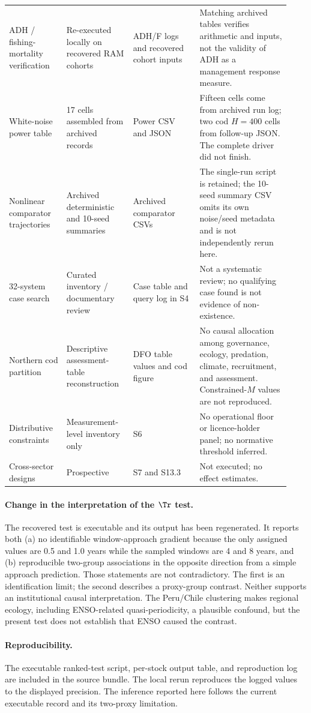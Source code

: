 \begin{longtable}{@{}p{0.19\linewidth}p{0.22\linewidth}p{0.22\linewidth}p{0.30\linewidth}@{}}
ADH / fishing-mortality verification & Re-executed locally on recovered RAM cohorts & ADH/F logs and recovered cohort inputs & Matching archived tables verifies arithmetic and inputs, not the validity of ADH as a management response measure. \\
White-noise power table & 17 cells assembled from archived records & Power CSV and JSON & Fifteen cells come from archived run log; two cod \(H=400\) cells from follow-up JSON. The complete driver did not finish. \\
Nonlinear comparator trajectories & Archived deterministic and 10-seed summaries & Archived comparator CSVs & The single-run script is retained; the 10-seed summary CSV omits its own noise/seed metadata and is not independently rerun here. \\
32-system case search & Curated inventory / documentary review & Case table and query log in S4 & Not a systematic review; no qualifying case found is not evidence of non-existence. \\
Northern cod partition & Descriptive assessment-table reconstruction & DFO table values and cod figure & No causal allocation among governance, ecology, predation, climate, recruitment, and assessment. Constrained-\(M\) values are not reproduced. \\
Distributive constraints & Measurement-level inventory only & S6 & No operational floor or licence-holder panel; no normative threshold inferred. \\
Cross-sector designs & Prospective & S7 and S13.3 & Not executed; no effect estimates. \\

\end{longtable}

\paragraph{Change in the interpretation of the \(\Tr\) test.} The recovered test is executable and its output has been regenerated. It reports both (a) no identifiable window-approach gradient because the only assigned values are 0.5 and 1.0 years while the sampled windows are 4 and 8 years, and (b) reproducible two-group associations in the opposite direction from a simple approach prediction. Those statements are not contradictory. The first is an identification limit; the second describes a proxy-group contrast. Neither supports an institutional causal interpretation. The Peru/Chile clustering makes regional ecology, including ENSO-related quasi-periodicity, a plausible confound, but the present test does not establish that ENSO caused the contrast.

\paragraph{Reproducibility.} The executable ranked-test script, per-stock output table, and reproduction log are included in the source bundle. The local rerun reproduces the logged values to the displayed precision. The inference reported here follows the current executable record and its two-proxy limitation.

